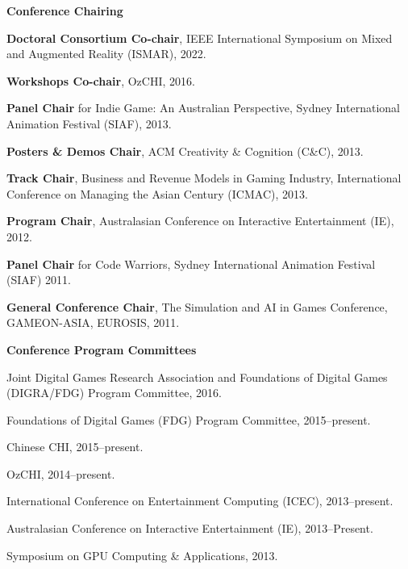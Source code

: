 \documentclass[10pt,a4paper]{article}
\renewenvironment{itemize}{
    \begin{list}{}{
            \setlength{\leftmargin}{1.5em}
            \setlength{\itemsep}{0.25em}
            \setlength{\parskip}{0pt}
            \setlength{\parsep}{0.25em}
        }
        }{
    \end{list}
}
\begin{document}
\begin{itemize}

    \item \textbf{Conference Chairing}
        \begin{itemize}
            \item \textbf{Doctoral Consortium Co-chair}, IEEE International Symposium on Mixed and Augmented Reality (ISMAR), 2022.
            \item \textbf{Workshops Co-chair}, OzCHI, 2016.
            \item \textbf{Panel Chair} for Indie Game: An Australian Perspective, Sydney International Animation Festival (SIAF), 2013.
            \item \textbf{Posters \& Demos Chair}, ACM Creativity \& Cognition (C\&C), 2013.
            \item \textbf{Track Chair}, Business and Revenue Models in Gaming Industry, International Conference on Managing the Asian Century (ICMAC), 2013.
            \item \textbf{Program Chair}, Australasian Conference on Interactive Entertainment (IE), 2012.
            \item \textbf{Panel Chair} for Code Warriors, Sydney International Animation Festival (SIAF) 2011.
            \item \textbf{General Conference Chair}, The Simulation and AI in Games Conference, GAMEON-ASIA, EUROSIS, 2011.
        \end{itemize}

    \item \textbf{Conference Program Committees}
        \begin{itemize}
            \item Joint Digital Games Research Association and Foundations of Digital Games (DIGRA/FDG) Program Committee, 2016.
            \item Foundations of Digital Games (FDG) Program Committee, 2015--present.
            \item Chinese CHI, 2015--present.
            \item OzCHI, 2014--present.
            \item International Conference on Entertainment Computing (ICEC), 2013--present.
            \item Australasian Conference on Interactive Entertainment (IE), 2013--Present.
            \item Symposium on GPU Computing \& Applications, 2013.
        \end{itemize}


\end{itemize}
\end{document}
